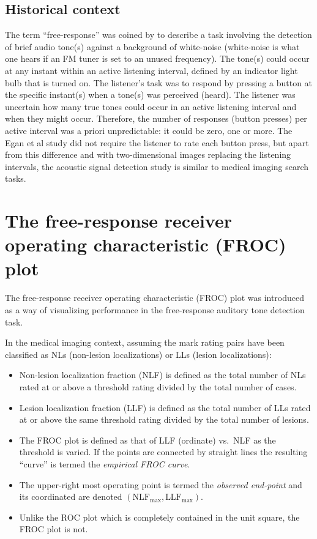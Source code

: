 \documentclass[
]{book}
\begin{document}
\hypertarget{historical-context}{%
\subsection{Historical context}\label{historical-context}}

The term ``free-response'' was coined by \citep{RN897} to describe a task involving the detection of brief audio tone(s) against a background of white-noise (white-noise is what one hears if an FM tuner is set to an unused frequency). The tone(s) could occur at any instant within an active listening interval, defined by an indicator light bulb that is turned on. The listener's task was to respond by pressing a button at the specific instant(s) when a tone(s) was perceived (heard). The listener was uncertain how many true tones could occur in an active listening interval and when they might occur. Therefore, the number of responses (button presses) per active interval was a priori unpredictable: it could be zero, one or more. The Egan et al study did not require the listener to rate each button press, but apart from this difference and with two-dimensional images replacing the listening intervals, the acoustic signal detection study is similar to medical imaging search tasks.

\hypertarget{froc-paradigm-froc-plot}{%
\section{The free-response receiver operating characteristic (FROC) plot}\label{froc-paradigm-froc-plot}}

The free-response receiver operating characteristic (FROC) plot was introduced \citep{RN2104} as a way of visualizing performance in the free-response auditory tone detection task.

In the medical imaging context, assuming the mark rating pairs have been classified as NLs (non-lesion localizations) or LLs (lesion localizations):

\begin{itemize}
\item
  Non-lesion localization fraction (NLF) is defined as the total number of NLs rated at or above a threshold rating divided by the total number of cases.
\item
  Lesion localization fraction (LLF) is defined as the total number of LLs rated at or above the same threshold rating divided by the total number of lesions.
\item
  The FROC plot is defined as that of LLF (ordinate) vs.~NLF as the threshold is varied. If the points are connected by straight lines the resulting ``curve'' is termed the \emph{empirical FROC curve}.
\item
  The upper-right most operating point is termed the \emph{observed end-point} and its coordinated are denoted \((\text{NLF}_{\text{max}}, \text{LLF}_{\text{max}})\).
\item
  Unlike the ROC plot which is completely contained in the unit square, the FROC plot is not.
\end{itemize}
\end{document}
